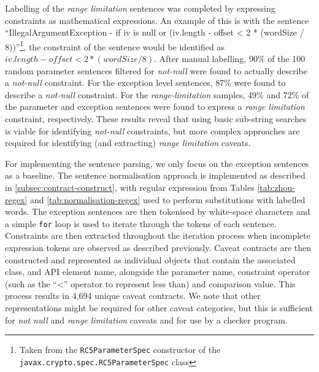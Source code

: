 Labelling of the \textit{range limitation} sentences was completed by expressing constraints as mathematical expressions. An example of this is with the sentence ``IllegalArgumentException - if iv is null or (iv.length - offset < 2 * (wordSize / 8))''\footnote{ Taken from the \lstinline{RC5ParameterSpec} constructor of the \lstinline{javax.crypto.spec.RC5ParameterSpec} class}, the constraint of the sentence would be identified as $iv.length-offset<2*(wordSize/8)$. After manual labelling, 90\% of the 100 random parameter sentences filtered for \textit{not-null} were found to actually describe a \textit{not-null} constraint. For the exception level sentences, 87\% were found to describe a \textit{not-null} constraint. For the \textit{range-limitation} samples, 49\% and 72\% of the parameter and exception sentences were found to express a \textit{range limitation} constraint, respectively. These results reveal that using basic sub-string searches is viable for identifying \textit{not-null} constraints, but more complex approaches are required for identifying (and extracting) \textit{range limitation} caveats. \bigbreak

For implementing the sentence parsing, we only focus on the exception sentences as a baseline. The sentence normalisation approach is implemented as described in \ref{subsec:contract-construct}, with regular expression from Tables \ref{tab:zhou-regex} and \ref{tab:normalisation-regex} used to perform substitutions with labelled words. The exception sentences are then tokenised by white-space characters and a simple \lstinline{for} loop is used to iterate through the tokens of each sentence. Constraints are then extracted throughout the iteration process when incomplete expression tokens are observed as described previously. Caveat contracts are then constructed and represented as individual objects that contain the associated class, and API element name, alongside the parameter name, constraint operator (such as the ``<'' operator to represent less than) and comparison value. This process results in 4,694 unique caveat contracts. We note that other representations might be required for other caveat categories, but this is sufficient for \textit{not null} and \textit{range limitation} caveats and for use by a checker program. \bigbreak


